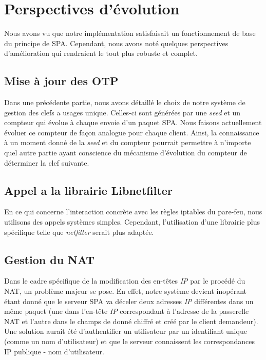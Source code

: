\chapter{Perspectives d'évolution}

Nous avons vu que notre implémentation satisfaisait un fonctionnement de base du principe de SPA.
Cependant, nous avons noté quelques perspectives d'amélioration qui rendraient le tout plus robuste et complet.

\section{Mise à jour des OTP}
Dans une précédente partie, nous avons détaillé le choix de notre système de gestion des clefs a usages unique. 
Celles-ci sont générées par une \emph{seed} et un compteur qui évolue à chaque envoie d'un paquet SPA.
Nous faisons actuellement évoluer ce compteur de façon analogue pour chaque client.
Ainsi, la connaissance à un moment donné de la \emph{seed} et du compteur pourrait permettre à n'importe quel autre partie ayant conscience du mécanisme d'évolution du compteur de déterminer la clef suivante.

\section{Appel a la librairie Libnetfilter}
En ce qui concerne l'interaction concrète avec les règles iptables du pare-feu, nous utilisons des appels systèmes simples. Cependant, l'utilisation d'une librairie plus spécifique telle que \emph{netfilter} serait plus adaptée.

\section{Gestion du NAT}
Dans le cadre spécifique de la modification des en-têtes \emph{IP} par le procédé du NAT, un problème majeur se pose.
En effet, notre système devient inopérant étant donné que le serveur SPA va déceler deux adresses \emph{IP} différentes dans un même paquet (une dans l'en-tête \emph{IP} correspondant à l'adresse de la passerelle NAT et l'autre dans le champs de donné chiffré et créé par le client demandeur).
Une solution aurait été d'authentifier un utilisateur par un identifiant unique (comme un nom d'utilisateur) et que le serveur connaissent les correspondances IP publique - nom d'utilisateur.
